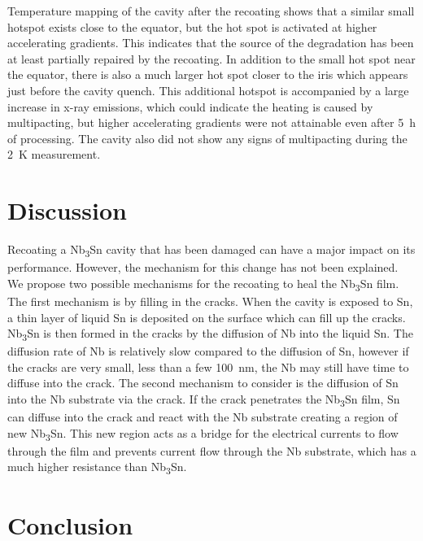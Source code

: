 \documentclass{revtex4-2}
\begin{document}
Temperature mapping of the cavity after the recoating shows that a similar small hotspot exists close to the equator, but the hot spot is activated at higher accelerating gradients. This indicates that the source of the degradation has been at least partially repaired by the recoating. In addition to the small hot spot near the equator, there is also a much larger hot spot closer to the iris which appears just before the cavity quench. This additional hotspot is accompanied by a large increase in x-ray emissions, which could indicate the heating is caused by multipacting, but higher accelerating gradients were not attainable even after \qty{5}{\hour} of processing. The cavity also did not show any signs of multipacting during the \qty{2}{\kelvin} measurement.



\section*{Discussion}
\label{sec:Discussion}

Recoating a Nb\textsubscript{3}Sn cavity that has been damaged can have a major impact on its performance. However, the mechanism for this change has not been explained. We propose two possible mechanisms for the recoating to heal the Nb\textsubscript{3}Sn film. The first mechanism is by filling in the cracks. When the cavity is exposed to Sn, a thin layer of liquid Sn is deposited on the surface which can fill up the cracks. Nb\textsubscript{3}Sn is then formed in the cracks by the diffusion of Nb into the liquid Sn. The diffusion rate of Nb is relatively slow compared to the diffusion of Sn, however if the cracks are very small, less than a few \qty{100}{nm}, the Nb may still have time to diffuse into the crack. The second mechanism to consider is the diffusion of Sn into the Nb substrate via the crack. If the crack penetrates the Nb\textsubscript{3}Sn film, Sn can diffuse into the crack and react with the Nb substrate creating a region of new Nb\textsubscript{3}Sn. This new region acts as a bridge for the electrical currents to flow through the film and prevents current flow through the Nb substrate, which has a much higher resistance than Nb\textsubscript{3}Sn. 




\section{Conclusion}
\label{sec:Conclusion}
\end{document}
